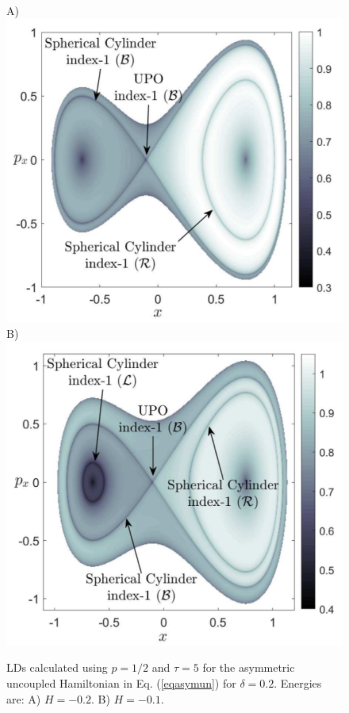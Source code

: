 \documentclass[10pt,aps,onecolumn,superscriptaddress]{revtex4-2}
\begin{document}
\begin{figure}[htbp]
	\begin{center}
		A)\includegraphics[scale=0.23]{LD_tau_5_y_-1sqrt2_delta_02_H_-02}
		B)\includegraphics[scale=0.23]{LD_tau_5_y_-1sqrt2_delta_02_H_-01}
	\end{center}
	\caption{LDs calculated using $p = 1/2$ and $\tau = 5$ for the asymmetric uncoupled Hamiltonian in Eq. (\ref{eqasymun}) for $\delta = 0.2$. Energies are: A) $H = -0.2$. B) $H = -0.1$.}\label{LD_delta_02}
\end{figure}
\end{document}
